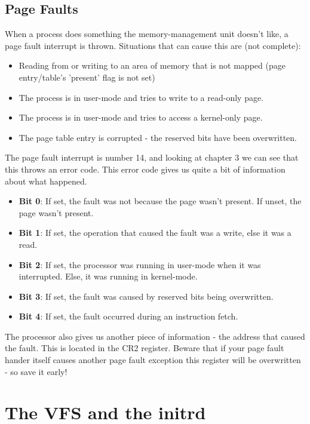 \documentclass[12pt]{article}
\begin{document}
\subsection{Page Faults}
When a process does something the memory-management unit doesn't like, a page fault interrupt is thrown. Situations that can cause this are (not complete):
\begin{itemize}
  \item Reading from or writing to an area of memory that is not mapped (page entry/table's 'present' flag is not set)
  \item The process is in user-mode and tries to write to a read-only page.
  \item The process is in user-mode and tries to access a kernel-only page.
  \item The page table entry is corrupted - the reserved bits have been overwritten.
\end{itemize}
The page fault interrupt is number 14, and looking at chapter 3 we can see that this throws an error code. This error code gives us quite a bit of information about what happened.
\begin{itemize}
  \item \textbf{Bit 0}: If set, the fault was not because the page wasn't present. If unset, the page wasn't present.
  \item \textbf{Bit 1}: If set, the operation that caused the fault was a write, else it was a read.
  \item \textbf{Bit 2}: If set, the processor was running in user-mode when it was interrupted. Else, it was running in kernel-mode.
  \item \textbf{Bit 3}: If set, the fault was caused by reserved bits being overwritten.
  \item \textbf{Bit 4}: If set, the fault occurred during an instruction fetch.
\end{itemize}
The processor also gives us another piece of information - the address that caused the fault. This is located in the CR2 register. Beware that if your page fault hander itself causes another page fault exception this register will be overwritten - so save it early!

\section{The VFS and the initrd}
\end{document}
